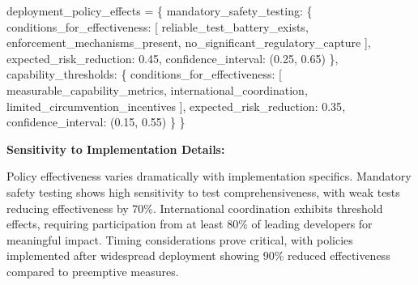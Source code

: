 \documentclass[
  11pt,
  letterpaper,
]{book}
\newenvironment{Shaded}{\begin{snugshade}}{\end{snugshade}}
\newcommand{\FloatTok}[1]{\textcolor[rgb]{0.68,0.00,0.00}{#1}}
\newcommand{\NormalTok}[1]{\textcolor[rgb]{0.00,0.23,0.31}{#1}}
\newcommand{\OperatorTok}[1]{\textcolor[rgb]{0.37,0.37,0.37}{#1}}
\newcommand{\StringTok}[1]{\textcolor[rgb]{0.13,0.47,0.30}{#1}}
\begin{document}
\begin{Shaded}
\begin{Highlighting}[]
\NormalTok{deployment\_policy\_effects }\OperatorTok{=}\NormalTok{ \{}
    \StringTok{\textquotesingle{}mandatory\_safety\_testing\textquotesingle{}}\NormalTok{: \{}
        \StringTok{\textquotesingle{}conditions\_for\_effectiveness\textquotesingle{}}\NormalTok{: [}
            \StringTok{\textquotesingle{}reliable\_test\_battery\_exists\textquotesingle{}}\NormalTok{,}
            \StringTok{\textquotesingle{}enforcement\_mechanisms\_present\textquotesingle{}}\NormalTok{,}
            \StringTok{\textquotesingle{}no\_significant\_regulatory\_capture\textquotesingle{}}
\NormalTok{        ],}
        \StringTok{\textquotesingle{}expected\_risk\_reduction\textquotesingle{}}\NormalTok{: }\FloatTok{0.45}\NormalTok{,}
        \StringTok{\textquotesingle{}confidence\_interval\textquotesingle{}}\NormalTok{: (}\FloatTok{0.25}\NormalTok{, }\FloatTok{0.65}\NormalTok{)}
\NormalTok{    \},}
    \StringTok{\textquotesingle{}capability\_thresholds\textquotesingle{}}\NormalTok{: \{}
        \StringTok{\textquotesingle{}conditions\_for\_effectiveness\textquotesingle{}}\NormalTok{: [}
            \StringTok{\textquotesingle{}measurable\_capability\_metrics\textquotesingle{}}\NormalTok{,}
            \StringTok{\textquotesingle{}international\_coordination\textquotesingle{}}\NormalTok{,}
            \StringTok{\textquotesingle{}limited\_circumvention\_incentives\textquotesingle{}}
\NormalTok{        ],}
        \StringTok{\textquotesingle{}expected\_risk\_reduction\textquotesingle{}}\NormalTok{: }\FloatTok{0.35}\NormalTok{,}
        \StringTok{\textquotesingle{}confidence\_interval\textquotesingle{}}\NormalTok{: (}\FloatTok{0.15}\NormalTok{, }\FloatTok{0.55}\NormalTok{)}
\NormalTok{    \}}
\NormalTok{\}}
\end{Highlighting}
\end{Shaded}

\textbf{Sensitivity to Implementation Details:}

Policy effectiveness varies dramatically with implementation specifics.
Mandatory safety testing shows high sensitivity to test
comprehensiveness, with weak tests reducing effectiveness by 70\%.
International coordination exhibits threshold effects, requiring
participation from at least 80\% of leading developers for meaningful
impact. Timing considerations prove critical, with policies implemented
after widespread deployment showing 90\% reduced effectiveness compared
to preemptive measures.
\end{document}
